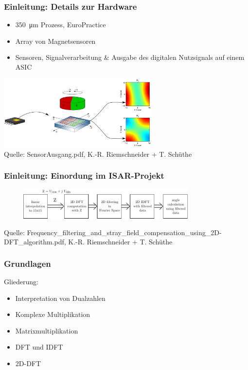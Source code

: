 \begin{frame}\frametitle{Einleitung: Details zur Hardware}
\begin{itemize}
 \item \SI{350}{\um} Prozess, EuroPractice
 \item Array von Magnetsensoren
 \item Sensoren, Signalverarbeitung \& Ausgabe des digitalen Nutzsignals auf einem ASIC
\end{itemize}
\begin{center}
 \includegraphics[width=0.6\textwidth]{img/Bilder/SensorAusgang.pdf}\\
 \tiny{Quelle: SensorAusgang.pdf, K.-R. Riemschneider + T. Schüthe}
\end{center}
\end{frame}



\begin{frame}\frametitle{Einleitung: Einordung im ISAR-Projekt}
\vspace{1cm}
 \begin{figure}[ht!]
 \centering
 \includegraphics[width=0.8\textwidth]{img/AblaufFourier.pdf}
 \label{pic:AblaufFourier}
\end{figure}
\vspace{2cm}
\begin{center}
 \tiny{Quelle: Frequency\_filtering\_and\_stray\_field\_compensation\_using\_2D-DFT\_algorithm.pdf, K.-R. Riemschneider + T. Schüthe}
\end{center}
\end{frame}



\begin{frame}\frametitle{Grundlagen}
Gliederung:
 \begin{itemize}
  \item Interpretation von Dualzahlen
  \item Komplexe Multiplikation
  \item Matrixmultiplikation
  \item DFT und IDFT
  \item 2D-DFT
 \end{itemize}
\end{frame}

